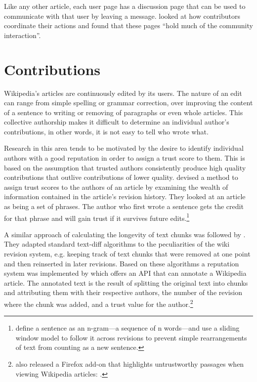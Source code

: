 Like any other article, each user page has a discussion page that can be used to communicate with that user by leaving a message.
\textcite{Viegas2007talk} looked at how contributors coordinate their actions and found that these pages ``hold much of the community interaction''.


\section{Contributions}\label{sec:contribution}

Wikipedia's articles are continuously edited by its users.
The nature of an edit can range from simple spelling or grammar correction, over improving the content of a sentence to writing or removing of paragraphs or even whole articles. 
This collective authorship makes it difficult to determine an individual author's contributions, in other words, it is not easy to tell who wrote what.

Research in this area tends to be motivated by the desire to identify individual authors with a good reputation in order to assign a trust score to them.
This is based on the assumption that trusted authors consistently produce high quality contributions that outlive contributions of lower quality.
\textcite{kramer2008wiki} devised a method to assign trust scores to the authors of an article by examining the wealth of information contained in the article's revision history.
They looked at an article as being a set of phrases.
The author who first wrote a sentence gets the credit for that phrase and will gain trust if it survives future edits.\footnote{\textcite{kramer2008wiki} define a sentence as an n-gram---a sequence of n words---and use a sliding window model to follow it across revisions to prevent simple rearrangements of text from counting as a new sentence.}

A similar approach of calculating the longevity of text chunks was followed by \textcite{adler2007content}.
They adapted standard text-diff algorithms to the peculiarities of the wiki revision system, e.g. keeping track of text chunks that were removed at one point and then reinserted in later revisions.
Based on these algorithms a reputation system was implemented by \textcite{adler2008assigning} which offers an \ac{API} that can annotate a Wikipedia article.
The annotated text is the result of splitting the original text into chunks and attributing them with their respective authors, the number of the revision where the chunk was added, and a trust value for the author.\footnote{\citeauthor{adler2008assigning} also released a Firefox add-on that highlights untrustworthy passages when viewing Wikipedia articles: .}


